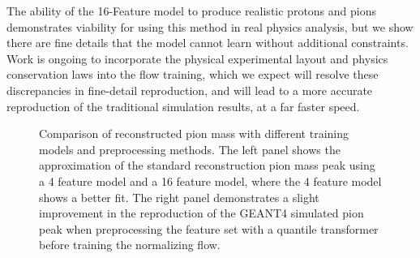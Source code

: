         The ability of the 16-Feature model to produce realistic protons and pions demonstrates viability for using this method in real physics analysis, but we show there are fine details that the model cannot learn without additional constraints. Work is ongoing to incorporate the physical experimental layout and physics conservation laws into the flow training, which we expect will resolve these discrepancies in fine-detail reproduction, and will lead to a more accurate reproduction of the traditional simulation results, at a far faster speed. 

        \begin{figure}[H]
            \centering
            \caption[Placeholder Short text]{Comparison of reconstructed pion mass with different training models and preprocessing methods. The left panel shows the approximation of the standard reconstruction pion mass peak using a 4 feature model and a 16 feature model, where the 4 feature model shows a better fit. The right panel demonstrates a slight improvement in the reproduction of the GEANT4 simulated pion peak when preprocessing the feature set with a quantile transformer before training the normalizing flow.}
            \label{fig:combined_pion_comparison}
        \end{figure}


